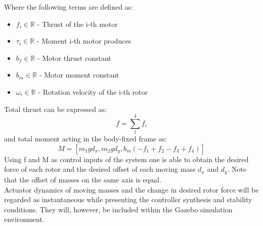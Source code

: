 \noindent Where the following terms are defined as:

\begin{itemize}
	\item $f_i \in \mathbb{R}$ - Thrust of the i-th motor
	
	\item $\tau_i \in \mathbb{R}$ - Moment i-th motor produces
	
	\item $b_f \in \mathbb{R}$ - Motor thrust constant
	
	\item $b_m \in \mathbb{R}$ - Motor moment constant
	
	\item $\omega_i \in \mathbb{R}$ - Rotation velocity of the i-th rotor
\end{itemize}

Total thrust can be expressed as:
\begin{equation}
	f = \sum_{1}^{4}f_i
\end{equation}
and total moment acting in the body-fixed frame as:
\begin{equation}
	M = [m_{1}gd_x ,m_{2}gd_y,b_m(-f_1 + f_2 - f_3 + f_4)]
\end{equation}
Using f and M as control inputs of the system one is able to obtain the desired force of each rotor and the desired offset of each moving mass $d_x$ and $d_y$. Note that the offset of masses on the same axis is equal. \\
Actuator dynamics of moving masses and the change in desired rotor force will be regarded as instantaneous while presenting the controller synthesis and stability conditions. They will, however, be included within the Gazebo simulation environment.